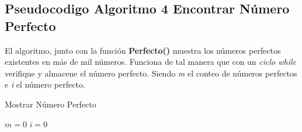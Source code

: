     \subsection{Pseudocodigo Algoritmo 4 Encontrar Número Perfecto}
        El algoritmo, junto con la función \textbf{Perfecto()} muestra los números perfectos existentes en más de mil números. Funciona de tal manera que con un \textit{ciclo while} verifique y almacene el número perfecto. Siendo \textit{m} el conteo de números perfectos e \textit{i} el número perfecto.
        \begin{algorithm}
            \caption{Mostrar Número Perfecto
            }\label{alg:two}
            $m = 0$\;
            $i = 0$\;
            
            
            
        \end{algorithm}
        
        
        
        
        